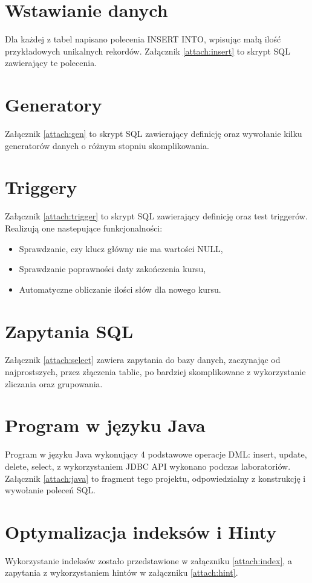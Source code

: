 \documentclass[11pt,a4paper]{article}
\begin{document}
\section{Wstawianie danych}
Dla każdej z tabel napisano polecenia INSERT INTO, wpisując małą ilość przykładowych unikalnych rekordów. Załącznik \ref{attach:insert} to skrypt SQL zawierający te polecenia.

\section{Generatory}
Załącznik \ref{attach:gen} to skrypt SQL zawierający definicję oraz wywołanie kilku generatorów danych o różnym stopniu skomplikowania.

\section{Triggery}
Załącznik \ref{attach:trigger} to skrypt SQL zawierający definicję oraz test triggerów. Realizują one nastepujące funkcjonalności:
\begin{itemize}
\item Sprawdzanie, czy klucz główny nie ma wartości NULL,
\item Sprawdzanie poprawności daty zakończenia kursu,
\item Automatyczne obliczanie ilości słów dla nowego kursu.
\end{itemize}

\section{Zapytania SQL}
Załącznik \ref{attach:select} zawiera zapytania do bazy danych, zaczynając od najprostszych, przez złączenia tablic, po bardziej skomplikowane z wykorzystanie zliczania oraz grupowania.

\section{Program w języku Java}
Program w języku Java wykonujący 4 podstawowe operacje DML: insert, update, delete, select, z wykorzystaniem JDBC API wykonano podczas laboratoriów. Załącznik \ref{attach:java} to fragment tego projektu, odpowiedzialny z konstrukcję i wywołanie poleceń SQL.

\section{Optymalizacja indeksów i Hinty}
Wykorzystanie indeksów zostało przedstawione w załączniku \ref{attach:index}, a zapytania z wykorzystaniem hintów w załączniku \ref{attach:hint}.
\end{document}
